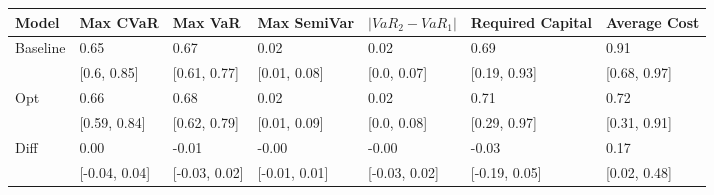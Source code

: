 \begin{tabular}{lllllll}
\toprule
   Model &      Max CVaR &       Max VaR &   Max SemiVar & $|VaR_2 - VaR_1|$ & Required Capital & Average Cost \\
\midrule
Baseline &          0.65 &          0.67 &          0.02 &              0.02 &             0.69 &         0.91 \\
         &   [0.6, 0.85] &  [0.61, 0.77] &  [0.01, 0.08] &       [0.0, 0.07] &     [0.19, 0.93] & [0.68, 0.97] \\
     Opt &          0.66 &          0.68 &          0.02 &              0.02 &             0.71 &         0.72 \\
         &  [0.59, 0.84] &  [0.62, 0.79] &  [0.01, 0.09] &       [0.0, 0.08] &     [0.29, 0.97] & [0.31, 0.91] \\
    Diff &          0.00 &         -0.01 &         -0.00 &             -0.00 &            -0.03 &         0.17 \\
         & [-0.04, 0.04] & [-0.03, 0.02] & [-0.01, 0.01] &     [-0.03, 0.02] &    [-0.19, 0.05] & [0.02, 0.48] \\
\bottomrule
\end{tabular}
